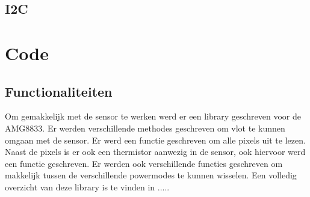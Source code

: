 \documentclass[]{article}
\begin{document}
\subsection{I2C}



\section{Code}
\subsection{Functionaliteiten}
Om gemakkelijk met de sensor te werken werd er een library geschreven voor de AMG8833. Er werden verschillende methodes geschreven om vlot te kunnen omgaan met de sensor. Er werd een functie geschreven om alle pixels uit te lezen. Naast de pixels is er ook een thermistor aanwezig in de sensor, ook hiervoor werd een functie geschreven. Er werden ook verschillende functies geschreven om makkelijk tussen de verschillende powermodes te kunnen wisselen. Een volledig overzicht van deze library is te vinden in .....
\end{document}
